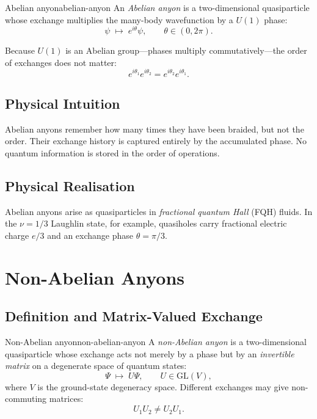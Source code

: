 \documentclass[11pt,a4paper]{article}
\begin{document}
\begin{defn}{Abelian anyon}{abelian-anyon}
  An \emph{Abelian anyon} is a two-dimensional quasiparticle whose exchange
  multiplies the many-body wavefunction by a $U(1)$ phase:
  \[
    \psi \;\mapsto\; e^{i\theta}\psi, \qquad \theta \in (0,2\pi).
  \]
\end{defn}

Because $U(1)$ is an Abelian group---phases multiply commutatively---the order
of exchanges does not matter:
\[
  e^{i\theta_1} e^{i\theta_2} = e^{i\theta_2} e^{i\theta_1}.
\]

\subsection{Physical Intuition}

Abelian anyons remember how many times they have been braided, but not the
order.  Their exchange history is captured entirely by the accumulated phase.
No quantum information is stored in the order of operations.

\subsection{Physical Realisation}

Abelian anyons arise as quasiparticles in \emph{fractional quantum Hall}
(FQH) fluids.  In the $\nu = 1/3$ Laughlin state, for example, quasiholes
carry fractional electric charge $e/3$ and an exchange phase $\theta = \pi/3$.

\section{Non-Abelian Anyons}

\subsection{Definition and Matrix-Valued Exchange}

\begin{defn}{Non-Abelian anyon}{non-abelian-anyon}
  A \emph{non-Abelian anyon} is a two-dimensional quasiparticle whose
  exchange acts not merely by a phase but by an \emph{invertible matrix} on a
  degenerate space of quantum states:
  \[
    \Psi \;\mapsto\; U\Psi,
    \qquad U \in \mathrm{GL}(V),
  \]
  where $V$ is the ground-state degeneracy space.  Different exchanges may
  give non-commuting matrices:
  \[
    U_1 U_2 \neq U_2 U_1.
  \]
\end{defn}
\end{document}
